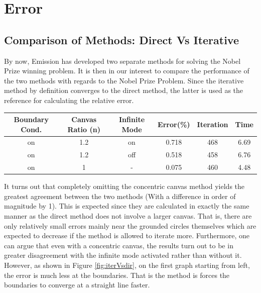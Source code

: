 \documentclass[a4paper]{article}
\begin{document}
\section{Error}
\subsection{Comparison of Methods: Direct Vs Iterative}
By now, Emission has developed two separate methods for solving the Nobel Prize 
winning problem. It is then in our interest to compare the performance of 
the two methods with regards to the Nobel Prize Problem. Since the iterative 
method by definition converges to the direct method, the latter is used as the 
reference for calculating the relative error. 

\begin{table}[h]
\centering
\begin{tabular}{c c c c c c}
Boundary Cond. & Canvas Ratio (n) & Infinite Mode & Error(\%) & Iteration &  
Time\\
\hline
on & 1.2 & on & 0.718 & 468 & 6.69 \\
on & 1.2 & off & 0.518 & 458 & 6.76 \\
on & 1 & - &  0.075 & 460 & 4.48\\
\end{tabular}
\end{table}
It turns out that completely omitting the concentric canvas method yields the 
greatest agreement between the two methods (With a difference in order of 
magnitude by 1). This is expected since they are calculated in exactly the same 
manner as the direct method does not involve a larger canvas. That is, there 
are only relatively small errors mainly near the grounded circles themselves 
which are expected to decrease if the method is allowed to iterate more. 
Furthermore, one can argue that even with a concentric canvas, the results turn 
out to be in greater disagreement with the infinite mode activated rather than 
without it. However, as shown in Figure \ref{fig:iterVsdir}, on the first graph 
starting from left, the error is much less at the boundaries. That is the 
method is forces the boundaries to converge at a straight line faster.  
\end{document}
